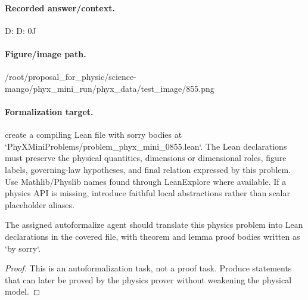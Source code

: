 \paragraph{Recorded answer/context.}
D: D: 0J

\paragraph{Figure/image path.}
/root/proposal\_for\_physic/science-mango/phyx\_mini\_run/phyx\_data/test\_image/855.png

\paragraph{Formalization target.}
create a compiling Lean file with sorry bodies at `PhyXMiniProblems/problem\_phyx\_mini\_0855.lean`. The Lean declarations must preserve the physical quantities, dimensions or dimensional roles, figure labels, governing-law hypotheses, and final relation expressed by this problem.
Use Mathlib/Physlib names found through LeanExplore where available. If a physics API is missing, introduce faithful local abstractions rather than scalar placeholder aliases.

\begin{theorem}
\label{thm:physics:phyx_mini_0855:target}
The assigned autoformalize agent should translate this physics problem into Lean declarations in the covered file, with theorem and lemma proof bodies written as `by sorry`.
\end{theorem}
\begin{proof}
This is an autoformalization task, not a proof task. Produce statements that can later be proved by the physics prover without weakening the physical model.
\end{proof}

